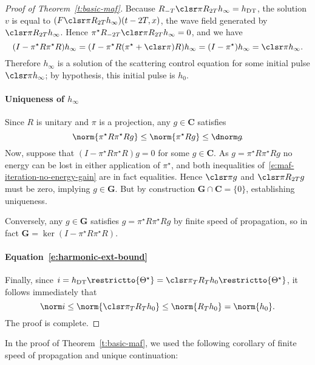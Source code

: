 \documentclass[10pt]{article}
\theoremstyle{plain}
\theoremstyle{definition}
\theoremstyle{remark}
\numberwithin{theorem}{section}
\numberwithin{example}{section}
\numberwithin{equation}{section}
\numberwithin{figure}{section}
\newcommand\DT{\ensuremath{_{\text{\normalfont DT}}}}		%
\begin{document}
\begin{proof}[Proof of Theorem~\ref{t:basic-maf}]
Because $R_{-T}\clsr\pi R_{2T} h_\infty=h\DT$, the solution $v$ is equal to $(F\clsr\pi R_{2T}h_\infty)(t-2T,x)$, the wave field generated by $\clsr\pi R_{2T}h_\infty$. Hence $\pi^\star R_{-2T}\clsr\pi R_{2T}h_\infty = 0$, and we have
%
\begin{equation}
	(I - \pi^\star R \pi^\star R)h_\infty = (I - \pi^\star R (\pi^\star+\clsr\pi) R)h_\infty = (I - \pi^\star)h_\infty = \clsr\pi h_\infty.
	\label{e:some-maf-solution}
\end{equation}
%
Therefore $h_\infty$ is a solution of the scattering control equation for some initial pulse $\clsr\pi h_\infty$; by hypothesis, this initial pulse is $h_0$.

\paragraph{Uniqueness of $h_\infty$}
	Since $R$ is unitary and $\pi$ is a projection, any $g\in\mathbf C$ satisfies
%
\begin{equation}
	\norm{\pi^\star R\pi^\star Rg} \leq \norm{\pi^\star R g} \leq \dnorm g\!.
	\label{e:maf-iteration-no-energy-gain}
\end{equation}
%
	Now, suppose that $(I-\pi^\star R\pi^\star R)g=0$ for some $g\in\mathbf C$. As $g=\pi^\star R\pi^\star Rg$ no energy can be lost in either application of $\pi^\star$, and both inequalities of~\eqref{e:maf-iteration-no-energy-gain} are in fact equalities. Hence $\clsr\pi g$ and $\clsr\pi R_{2T}g$ must be zero, implying $g\in \mathbf G$. But by construction $\mathbf G\cap\mathbf C=\{0\}$, establishing uniqueness.
	
	Conversely, any $g\in\mathbf G$ satisfies $g=\pi^\star R\pi^\star R g$ by finite speed of propagation, so in fact $\mathbf G = \ker(I-\pi^\star R\pi^\star R)$.


\paragraph{Equation~\eqref{e:harmonic-ext-bound}}

Finally, since $i=h\DT\restrictto{\Theta^\star}=\clsr\pi_T R_Th_0\restrictto{\Theta^\star}$, it follows immediately that
\begin{equation}
	\norm i \leq\norm{\clsr\pi_T R_Th_0}\leq\norm{R_Th_0}=\norm{h_0}.
\end{equation}
The proof is complete.
\end{proof}

\noindent In the proof of Theorem~\ref{t:basic-maf}, we used the following corollary of finite speed of propagation and unique continuation:
\end{document}
